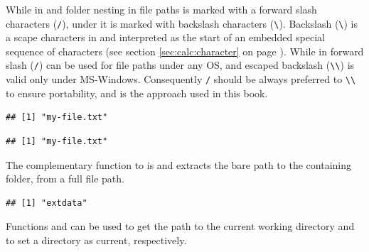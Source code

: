 \documentclass[krantz2]{krantz}\usepackage{knitr}%
\begin{document}
\begin{warningbox}
While in  and  folder nesting in file paths is marked with a forward slash characters (\verb|/|), under  it is marked with backslash characters (\verb|\|). Backslash (\verb|\|) is a scape characters in \Rlang and interpreted as the start of an embedded special sequence of characters (see section \ref{sec:calc:character} on page \pageref{sec:calc:character}). While in \Rlang forward slash (\verb|/|) can be used for file paths under any OS, and escaped backslash (\verb|\\|) is valid only under MS-Windows. Consequently \verb|/| should be always preferred to \verb|\\| to ensure portability, and is the approach used in this book.

\begin{knitrout}\footnotesize
{}\color{fgcolor}\begin{kframe}
\begin{alltt}
\hlstd{(}\hlstd{)}
\end{alltt}
\begin{verbatim}
## [1] "my-file.txt"
\end{verbatim}
\begin{alltt}
\hlstd{(}\hlstd{)}
\end{alltt}
\begin{verbatim}
## [1] "my-file.txt"
\end{verbatim}
\end{kframe}
\end{knitrout}
\end{warningbox}

The complementary function to  is  and extracts the bare path to the containing folder, from a full file path.

\begin{knitrout}\footnotesize
{}\color{fgcolor}\begin{kframe}
\begin{alltt}
\hlstd{(}\hlstd{)}
\end{alltt}
\begin{verbatim}
## [1] "extdata"
\end{verbatim}
\end{kframe}
\end{knitrout}
Functions  and  can be used to get the path to the current working directory and to set a directory as current, respectively.
\end{document}
